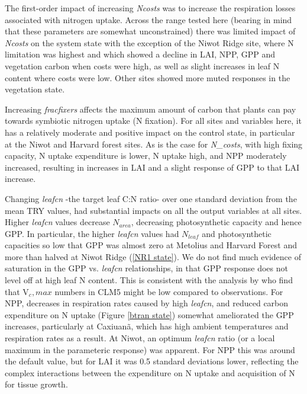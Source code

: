 \documentclass[draft,linenumbers]{agujournal}
\begin{document}
The first-order impact of increasing \emph{Ncosts} was to increase the respiration losses associated with nitrogen uptake.  Across the range tested here (bearing in mind that these parameters are somewhat unconstrained) there was limited impact of \emph{Ncosts} on the system state with the exception of the Niwot Ridge site, where N limitation was highest and which showed a decline in LAI, NPP, GPP and vegetation carbon when costs were high, as well as slight increases in leaf N content where costs were low. Other sites showed more muted responses in the vegetation state. 

Increasing \emph{fracfixers} affects the maximum amount of carbon that plants can pay towards symbiotic nitrogen uptake (N fixation). For all sites and variables here, it has a relatively moderate and positive impact on the control state, in particular at the Niwot and Harvard forest sites. As is the case for \emph{N\_costs}, with high fixing capacity, N uptake expenditure is lower, N uptake high, and NPP moderately increased, resulting in increases in LAI and a slight response of GPP to that LAI increase.

Changing \emph{leafcn} -the target leaf C:N ratio- over one standard deviation from the mean TRY values, had substantial impacts on all the output variables at all sites. Higher \emph{leafcn} values decrease $N_{area}$, decreasing photosynthetic capacity and hence GPP.  In particular, the higher \emph{leafcn} values had $N_{leaf}$ and photosynthetic capacities so low that GPP was almost zero at Metolius and Harvard Forest and more than halved at Niwot Ridge (\ref{NR1 state}).  We do not find much evidence of saturation in the GPP vs. \emph{leafcn} relationships, in that GPP response does not level off at high leaf N content. This is consistent with the analysis by \cite{lawrence2018} who find that V${_c,max}$ numbers in CLM5 might be low compared to observations.  For NPP,  decreases in respiration rates caused by high \emph{leafcn}, and reduced carbon expenditure on N uptake (Figure \ref{btran state}) somewhat ameliorated the GPP increases, particularly at Caxiuan\~a, which has high ambient temperatures and respiration rates as a result. At Niwot, an optimum \emph{leafcn} ratio (or a local maximum in the parameteric response) was apparent. For NPP this was around the default value, but for LAI it was 0.5 standard deviations lower, reflecting the complex interactions between the expenditure on N uptake and acquisition of N for tissue growth. 
\end{document}
